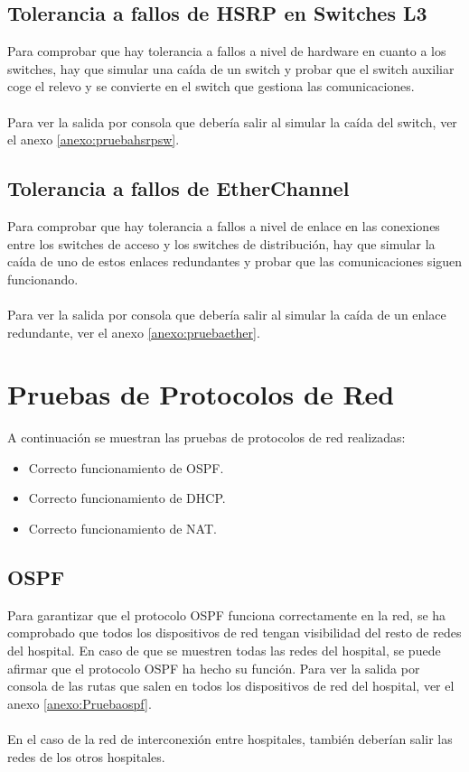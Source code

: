 \subsection{Tolerancia a fallos de HSRP en Switches L3}
Para comprobar que hay tolerancia a fallos a nivel de hardware en cuanto a los switches, hay que simular una caída de un switch y probar que el switch auxiliar coge el relevo y se convierte en 
el switch que gestiona las comunicaciones.
\\ \\ 
Para ver la salida por consola que debería salir al simular la caída del switch, ver el anexo \ref{anexo:pruebahsrpsw}.

\subsection{Tolerancia a fallos de EtherChannel}
Para comprobar que hay tolerancia a fallos a nivel de enlace en las conexiones entre los switches de acceso y los switches de distribución, hay que simular la caída de uno de estos enlaces redundantes y probar que las comunicaciones siguen funcionando.
\\ \\ 
Para ver la salida por consola que debería salir al simular la caída de un enlace redundante, ver el anexo \ref{anexo:pruebaether}.

\section{Pruebas de Protocolos de Red}
A continuación se muestran las pruebas de protocolos de red realizadas:
\begin{itemize}
    \item Correcto funcionamiento de OSPF.
    \item Correcto funcionamiento de DHCP.
    \item Correcto funcionamiento de NAT.
\end{itemize}
\subsection{OSPF}
Para garantizar que el protocolo OSPF funciona correctamente en la red, se ha comprobado que todos los dispositivos de red tengan visibilidad del resto de redes del hospital. 
En caso de que se muestren todas las redes del hospital, se puede afirmar que el protocolo OSPF ha hecho su función. Para ver la salida por consola de las rutas que salen en todos 
los dispositivos de red del hospital, ver el anexo \ref{anexo:Pruebaospf}.
\\ \\ 
En el caso de la red de interconexión entre hospitales, también deberían salir las redes de los otros hospitales.

